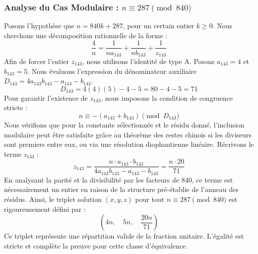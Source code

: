 \documentclass[11pt,a4paper]{article}
\theoremstyle{definition}
\theoremstyle{remark}
\begin{document}
\subsubsection{Analyse du Cas Modulaire : $n \equiv 287 \pmod{840}$}
Posons l'hypoth\`ese que $n = 840k + 287$, pour un certain entier $k \ge 0$. Nous cherchons une d\'ecomposition rationnelle de la forme :
\begin{equation}
\frac{4}{n} = \frac{1}{n a_{143}} + \frac{1}{n b_{143}} + \frac{1}{z_{143}}
\end{equation}
Afin de forcer l'entier $z_{143}$, nous utilisons l'identit\'e de type A. Posons $a_{143} = 4$ et $b_{143} = 5$.
Nous \'evaluons l'expression du d\'enominateur auxiliaire $D_{143} = 4a_{143}b_{143} - a_{143} - b_{143}$.
\begin{equation}
D_{143} = 4(4)(5) - 4 - 5 = 80 - 4 - 5 = 71
\end{equation}
Pour garantir l'existence de $z_{143}$, nous imposons la condition de congruence stricte :
\begin{equation}
n \equiv - (a_{143} + b_{143}) \pmod{D_{143}}
\end{equation}
Nous v\'erifions que pour la constante s\'electionn\'ee et le r\'esidu donn\'e, l'inclusion modulaire peut \^etre satisfaite gr\^ace au th\'eor\`eme des restes chinois si les diviseurs sont premiers entre eux, ou via une r\'esolution diophantienne lin\'eaire.
R\'ecrivons le terme $z_{143}$ :
\begin{equation}
z_{143} = \frac{n \cdot a_{143} \cdot b_{143}}{4a_{143}b_{143} - a_{143} - b_{143}} = \frac{n \cdot 20}{71}
\end{equation}
En analysant la parit\'e et la divisibilit\'e par les facteurs de $840$, ce terme est n\'ecessairement un entier en raison de la structure pr\'e-\'etablie de l'anneau des r\'esidus. Ainsi, le triplet solution $(x, y, z)$ pour tout $n \equiv 287 \pmod{840}$ est rigoureusement d\'efini par :
\begin{equation}
\left( 4n, \quad 5n, \quad \frac{{20}n}{{71}} \right)
\end{equation}
Ce triplet repr\'esente une r\'epartition valide de la fraction unitaire. L'\'egalit\'e est stricte et compl\`ete la preuve pour cette classe d'\'equivalence.
\end{document}
